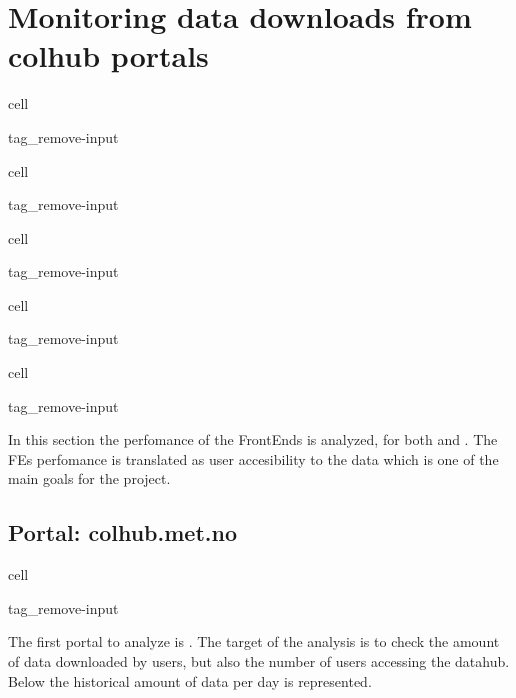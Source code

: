 \documentclass[letterpaper,10pt,english]{jupyterBook}
\begin{document}
\chapter{Monitoring data downloads from colhub portals}
\label{\detokenize{user_downloads:monitoring-data-downloads-from-colhub-portals}}\label{\detokenize{user_downloads::doc}}
\begin{sphinxuseclass}{cell}
\begin{sphinxuseclass}{tag_remove-input}
\end{sphinxuseclass}
\end{sphinxuseclass}
\begin{sphinxuseclass}{cell}
\begin{sphinxuseclass}{tag_remove-input}
\end{sphinxuseclass}
\end{sphinxuseclass}
\begin{sphinxuseclass}{cell}
\begin{sphinxuseclass}{tag_remove-input}
\end{sphinxuseclass}
\end{sphinxuseclass}
\begin{sphinxuseclass}{cell}
\begin{sphinxuseclass}{tag_remove-input}
\end{sphinxuseclass}
\end{sphinxuseclass}
\begin{sphinxuseclass}{cell}
\begin{sphinxuseclass}{tag_remove-input}
\end{sphinxuseclass}
\end{sphinxuseclass}
\sphinxAtStartPar
In this section the perfomance of the FrontEnds is analyzed, for both  and . The FEs perfomance is translated as user accesibility to the data which is one of the main goals for the project.


\section{Portal: colhub.met.no}
\label{\detokenize{user_downloads:portal-colhub-met-no}}
\begin{sphinxuseclass}{cell}
\begin{sphinxuseclass}{tag_remove-input}
\end{sphinxuseclass}
\end{sphinxuseclass}
\sphinxAtStartPar
The first portal to analyze is . The target of the analysis is to check the amount of data downloaded by users, but also the number of users accessing the datahub. Below the historical amount of data per day is represented.
\end{document}
